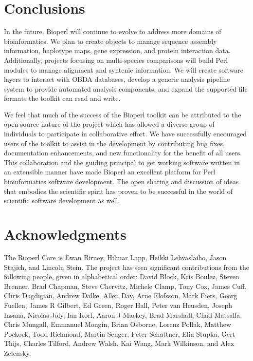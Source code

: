 \documentclass[12pt]{article}
\begin{document}
\section{Conclusions}

In the future, Bioperl will continue to evolve to address more domains
of bioinformatics.  We plan to create objects to manage sequence
assembly information, haplotype maps, gene expression, and protein
interaction data.  Additionally, projects focusing on multi-species
comparisons will build Perl modules to manage alignment and syntenic
information.  We will create software layers to interact with OBDA
databases, develop a generic analysis pipeline system to provide
automated analysis components, and expand the supported file formats
the toolkit can read and write.

We feel that much of the success of the Bioperl toolkit can be
attributed to the open source nature of the project which has allowed
a diverse group of individuals to participate in collaborative effort.
We have successfully encouraged users of the toolkit to assist in the
development by contributing bug fixes, documentation enhancements, and
new functionality for the benefit of all users. This collaboration and
the guiding principal to get working software written in an extensible
manner have made Bioperl an excellent platform for Perl bioinformatics
software development.  The open sharing and discussion of ideas that
embodies the scientific spirit has proven to be successful in the
world of scientific software development as well.

\section{Acknowledgments}

The Bioperl Core is Ewan Birney, Hilmar Lapp, Heikki Lehv\"{a}slaiho,
Jason Stajich, and Lincoln Stein.  The project has seen significant
contributions from the following people, given in alphabetical order:
David Block, Kris Boulez, Steven Brenner, Brad Chapman, Steve
Chervitz, Michele Clamp, Tony Cox, James Cuff, Chris Dagdigian, Andrew
Dalke, Allen Day, Arne Elofsson, Mark Fiers, Georg Fuellen, James R
Gilbert, Ed Green, Roger Hall, Peter van Heusden, Joseph Insana,
Nicolas Joly, Ian Korf, Aaron J Mackey, Brad Marshall, Chad Matsalla,
Chris Mungall, Emmanuel Mongin, Brian Osborne, Lorenz Pollak, Matthew
Pockock, Todd Richmond, Martin Senger, Peter Schattner, Elia Stupka,
Gert Thijs, Charles Tilford, Andrew Walsh, Kai Wang, Mark Wilkinson,
and Alex Zelensky.
\end{document}
